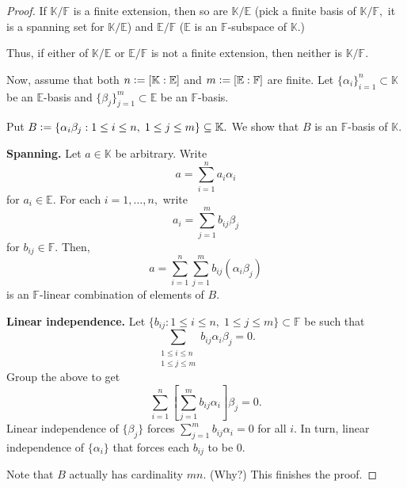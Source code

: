 \towerlaw*\label{thm:towerlaw2}
\begin{flushright}\hyperref[thm:towerlaw]{\upsym}\end{flushright}
\begin{proof}
    If $\mathbb{K}/\mathbb{F}$ is a finite extension, then so are $\mathbb{K}/\mathbb{E}$ (pick a finite basis of $\mathbb{K}/\mathbb{F},$ it is a spanning set for $\mathbb{K}/\mathbb{E}$) and $\mathbb{E}/\mathbb{F}$ ($\mathbb{E}$ is an $\mathbb{F}$-subspace of $\mathbb{K}.$)

    Thus, if either of $\mathbb{K}/\mathbb{E}$ or $\mathbb{E}/\mathbb{F}$ is not a finite extension, then neither is $\mathbb{K}/\mathbb{F}.$

    Now, assume that both $n \vcentcolon= [\mathbb{K} : \mathbb{E}]$ and $m \vcentcolon= [\mathbb{E} : \mathbb{F}]$ are finite. Let $\{\alpha_i\}_{i = 1}^n \subset \mathbb{K}$ be an $\mathbb{E}$-basis and $\{\beta_j\}_{j = 1}^m \subset \mathbb{E}$ be an $\mathbb{F}$-basis.

    Put $B \vcentcolon= \{\alpha_i\beta_j : 1 \le i \le n,\; 1 \le j \le m\} \subset \mathbb{K}.$ We show that $B$ is an $\mathbb{F}$-basis of $\mathbb{K}.$

    \textbf{Spanning.} Let $a \in \mathbb{K}$ be arbitrary. Write 
    \begin{equation*} 
        a = \sum_{i = 1}^{n} a_i \alpha_i
    \end{equation*}
    for $a_i \in \mathbb{E}.$ For each $i = 1, \ldots, n,$ write
    \begin{equation*} 
        a_i = \sum_{j = 1}^{m} b_{ij} \beta_j
    \end{equation*}
    for $b_{ij} \in \mathbb{F}.$ Then,
    \begin{equation*} 
        a = \sum_{i = 1}^{n}\sum_{j = 1}^{m}b_{ij} (\alpha_i\beta_j)
    \end{equation*}
    is an $\mathbb{F}$-linear combination of elements of $B.$

    \textbf{Linear independence.} Let $\{b_{ij} : 1 \le i \le n,\; 1 \le j \le m\} \subset \mathbb{F}$ be such that
    \begin{equation*} 
        \sum_{\substack{1 \le i \le n \\ 1 \le j \le m}} b_{ij}\alpha_i\beta_j = 0.
    \end{equation*} 
    Group the above to get
    \begin{equation*} 
        \sum_{i = 1}^{n}\left[\sum_{j = 1}^{m}b_{ij} \alpha_i\right]\beta_j = 0.
    \end{equation*}
    Linear independence of $\{\beta_j\}$ forces $\sum_{j = 1}^{m}b_{ij} \alpha_i = 0$ for all $i.$ In turn, linear independence of $\{\alpha_i\}$ that forces each $b_{ij}$ to be $0.$

    Note that $B$ actually has cardinality $mn.$ (Why?) This finishes the proof.
\end{proof}

